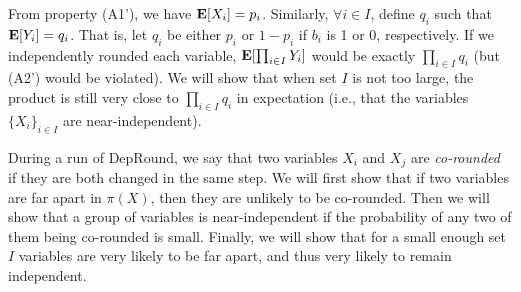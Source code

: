 From property (A1'), we have $\text{\bf E}[X_i]=p_i$. Similarly, $\forall i\in I$, define $q_i$ such that $\text{\bf E}[Y_i]=q_i$. That is, let $q_i$ be either $p_i$ or $1-p_i$ if $b_i$ is 1 or 0, respectively. If we independently rounded each variable, $\text{\bf E}[\prod_{i\in I} Y_i]$ would be exactly $\prod_{i\in I}q_i$ (but (A2') would be violated). We will show that when set $I$ is not too large, the product is still very close to $\prod_{i\in I}q_i$ in expectation (i.e., that the variables $\{X_i\}_{i\in I}$ are near-independent). 

During a run of {\sc DepRound}, we say that two variables $X_i$ and $X_j$ are \emph{co-rounded} if they are both changed in the same step. We will first show that if two variables are far apart in $\pi(X)$, then they are unlikely to be co-rounded. Then we will show that a group of variables is near-independent if the probability of any two of them being co-rounded is small. Finally, we will show that for a small enough set $I$ variables are very likely to be far apart, and thus very likely to remain independent.


